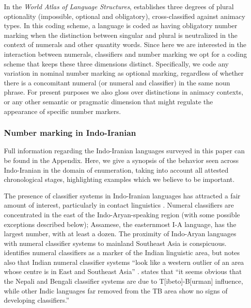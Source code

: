 \documentclass[11pt]{article}
\begin{document}
In the {\it World Atlas of Language Structures}, \citet{Haspelmath2013} establishes three degrees of plural optionality (impossible, optional and obligatory), cross-classified against animacy types.
In this coding scheme, a language is coded as having obligatory number marking when the distinction between singular and plural is neutralized in the context of numerals and other quantity words. 
Since here we are interested in the interaction between numerals, classifiers and number marking we opt for a coding scheme that keeps these three dimensions distinct. 
Specifically, we code any variation in nominal number marking as optional marking, regardless of whether there is a concomitant numeral (or numeral and classifier) in the same noun phrase. 
For present purposes we also gloss over distinctions in animacy contexts, or any other semantic or pragmatic dimension that might regulate the appearance of specific number markers. 


\subsubsection{Number marking in Indo-Iranian}

Full information regarding the Indo-Iranian languages surveyed in this paper can be found in the Appendix. Here, we give a synopsis of the behavior seen across Indo-Iranian in the domain of enumeration, taking into account all attested chronological stages, highlighting examples which we believe to be important. %

The presence of classifier systems in Indo-Iranian languages has attracted a fair amount of interest, particularly in contact linguistics \citep[85ff.]{ThomasonKaufman1988}.
Numeral classifiers are concentrated in the east of the Indo-Aryan-speaking region (with some possible exceptions described below); Assamese, the easternmost I-A language, has the largest number, with at least a dozen.
The proximity of Indo-Aryan languages with numeral classifier systems to mainland Southeast Asia is conspicuous. \citet{Emeneau1956,Emeneau1965} identifies numeral classifiers as a marker of the Indian linguistic area, but notes also that Indian numeral classifier systems ``look like a western outlier of an area whose centre is in East and Southeast Asia'' \citep[33]{Emeneau1965}.
\citet[78]{Matisoff1978} states that ``it seems obvious that the Nepali and Bengali classifier systems are due to T[ibeto]-B[urman] influence, while other Indic languages far removed from the TB area show no signs of developing classifiers.''
\end{document}

